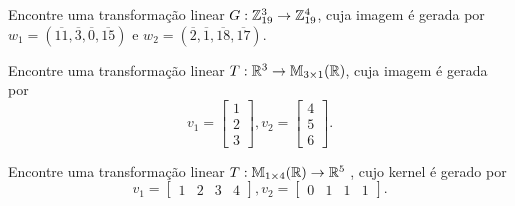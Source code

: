 \documentclass[12pt]{exam}
\begin{document}
\begin{exercicio}
	Encontre uma transforma\c{c}\~ao linear $G : \mathbb{Z}_{19}^3 \to \mathbb{Z}_{19}^4$, cuja imagem \'e gerada por $w_1 = (\overline{11},\overline{3},\overline{0},\overline{15})$ e $w_2 = (\overline{2},\overline{1},\overline{18},\overline{17})$.
\end{exercicio}

\begin{exercicio}
	Encontre uma transforma\c{c}\~ao linear $T : \mathbb{R}^3 \to \mathbb{M}_{3 \times 1}(\mathbb{R})$, cuja imagem \'e gerada por
	\[
	v_1 = \begin{bmatrix}
		1\\2\\3
	\end{bmatrix}, v_2 = \begin{bmatrix}
		4\\5\\6
	\end{bmatrix}.
	\]
\end{exercicio}

\begin{exercicio}
	Encontre uma transforma\c{c}\~ao linear $T : \mathbb{M}_{1 \times 4}(\mathbb{R}) \to \mathbb{R}^5$ , cujo kernel \'e gerado por
	\[
	v_1 = \begin{bmatrix}
		1 & 2 & 3 & 4
	\end{bmatrix}, v_2 = \begin{bmatrix}
		0 & 1 & 1 & 1
	\end{bmatrix}.
	\]
\end{exercicio}
\end{document}
